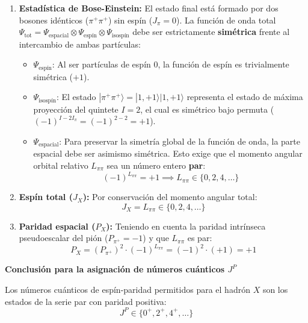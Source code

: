 \begin{problema}
\begin{enumerate}[label=\arabic*.]
    \item \textbf{Estadística de Bose-Einstein:} El estado final está formado por dos bosones idénticos ($\pi^+\pi^+$) sin espín ($J_\pi = 0$). La función de onda total $\Psi_{\text{tot}} = \Psi_{\text{espacial}} \otimes \Psi_{\text{espín}} \otimes \Psi_{\text{isospín}}$ debe ser estrictamente \textbf{simétrica} frente al intercambio de ambas partículas:
    \begin{itemize}
        \item $\Psi_{\text{espín}}$: Al ser partículas de espín 0, la función de espín es trivialmente simétrica ($+1$).
        \item $\Psi_{\text{isospín}}$: El estado $|\pi^+\pi^+\rangle = |1, +1\rangle |1, +1\rangle$ representa el estado de máxima proyección del quintete $I = 2$, el cual es simétrico bajo permuta ($(-1)^{I - 2I_\pi} = (-1)^{2-2} = +1$).
        \item $\Psi_{\text{espacial}}$: Para preservar la simetría global de la función de onda, la parte espacial debe ser asimismo simétrica. Esto exige que el momento angular orbital relativo $L_{\pi\pi}$ sea un número entero \textbf{par}:
        \begin{equation*}
            (-1)^{L_{\pi\pi}} = +1 \implies L_{\pi\pi} \in \{0, 2, 4, \dots\}
        \end{equation*}
    \end{itemize}
    \item \textbf{Espín total ($J_X$):} Por conservación del momento angular total:
    \begin{equation*}
        J_X = L_{\pi\pi} \in \{0, 2, 4, \dots\}
    \end{equation*}
    \item \textbf{Paridad espacial ($P_X$):} Teniendo en cuenta la paridad intrínseca pseudoescalar del pión ($P_{\pi^+} = -1$) y que $L_{\pi\pi}$ es par:
    \begin{equation*}
        P_X = (P_{\pi^+})^2 \cdot (-1)^{L_{\pi\pi}} = (-1)^2 \cdot (+1) = +1
    \end{equation*}
\end{enumerate}

\textbf{Conclusión para la asignación de números cuánticos $J^P$}

Los números cuánticos de espín-paridad permitidos para el hadrón $X$ son los estados de la serie par con paridad positiva:
\begin{equation*}
    J^P \in \{0^+, 2^+, 4^+, \dots\}
\end{equation*}

\end{problema}

